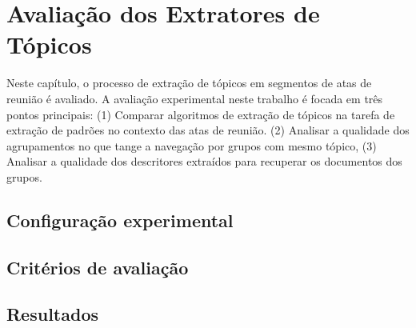 \chapter{Avaliação dos Extratores de Tópicos}\label{cap-extratores}

Neste capítulo, o processo de extração de tópicos em segmentos de atas de reunião é avaliado. A avaliação experimental neste trabalho é focada em três pontos principais: 
(1) Comparar algoritmos de extração de tópicos na tarefa de extração de padrões no contexto das atas de reunião. %
(2) Analisar a qualidade dos agrupamentos no que tange a navegação por grupos com mesmo tópico, 
(3) Analisar a qualidade dos descritores extraídos para recuperar os documentos dos grupos.




\section{Configuração experimental}


\section{Critérios de avaliação}


\section{Resultados}



